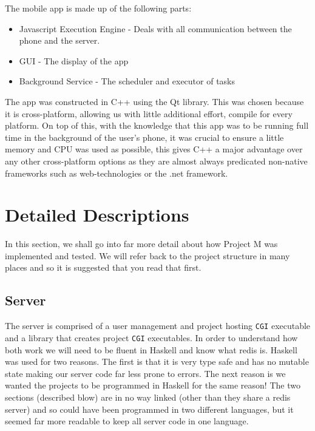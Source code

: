 \documentclass{article}
\begin{document}
The mobile app is made up of the following parts:
\begin{itemize}
  \item{Javascript Execution Engine - Deals with all communication between the phone and the server.}
  \item{GUI - The display of the app}
  \item{Background Service - The scheduler and executor of tasks}
\end{itemize}
The app was constructed in C++ using the Qt library. This was chosen because it is cross-platform, allowing us with little additional effort, compile for
every platform. On top of this, with the knowledge that this app was to be running full time in the background of the user's phone, it was crucial to
ensure a little memory and CPU was used as possible, this gives C++ a major advantage over any other cross-platform options as they are almost always
predicated non-native frameworks such as web-technologies or the .net framework.
\section{Detailed Descriptions}
In this section, we shall go into far more detail about how Project M was implemented and tested. We will refer back to the project structure in
many places and so it is suggested that you read that first.
\subsection{Server}
The server is comprised of a user management and project hosting \texttt{CGI} executable and a library that creates project \texttt{CGI} executables.
In order to understand how both work we will need to be fluent in Haskell and know what redis is. Haskell was used for two reasons. The first is that
it is very type safe and has no mutable state making our server code far less prone to errors. The next reason is we wanted the projects to be
programmed in Haskell for the same reason! The two sections (described blow) are in no way linked (other than they share a redis server) and so
could have been programmed in two different languages, but it seemed far more readable to keep all server code in one language.
\end{document}
